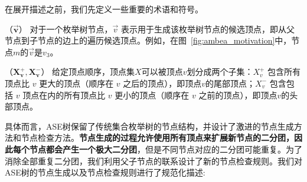 在展开描述之前，我们先定义一些重要的术语和符号。

\begin{definition}
  （$\vec{\mathbf{v}}$） 对于一个枚举树节点，$\vec{v}$ 表示用于生成该枚举树节点的候选顶点，即从父节点到子节点的边上的遍历候选顶点。例如，在图~\ref{fig:ambea_motivation}中，节点$m$的$\vec{v}$是$v_3$。
\end{definition}

\begin{definition}
  （$\mathbf{X_v^+, X_v^-}$） 给定顶点顺序，顶点集$X$可以被顶点$v$划分成两个子集：$X_v^+$ 包含所有顶点比 $v$ 更大的顶点（顺序在 $v$ 之后的顶点），即顶点$v$的尾部顶点；$X_v^-$ 包含包括 $v$ 顶点在内的所有顶点比 $v$ 更小的顶点（顺序在 $v$ 之前的顶点），即顶点$v$的头部顶点。
\end{definition}


具体而言，ASE树保留了传统集合枚举树的节点结构，并设计了激进的节点生成方法和节点检查方法。\textbf{节点生成的过程允许使用所有顶点来扩展新节点的二分团，因此每个节点都会产生一个极大二分团}，但是不同节点对应的二分团可能重复。为了消除全部重复二分团，我们利用父子节点的联系设计了新的节点检查规则。我们对ASE树的节点生成以及节点检查规则进行了规范化描述:


  
  
